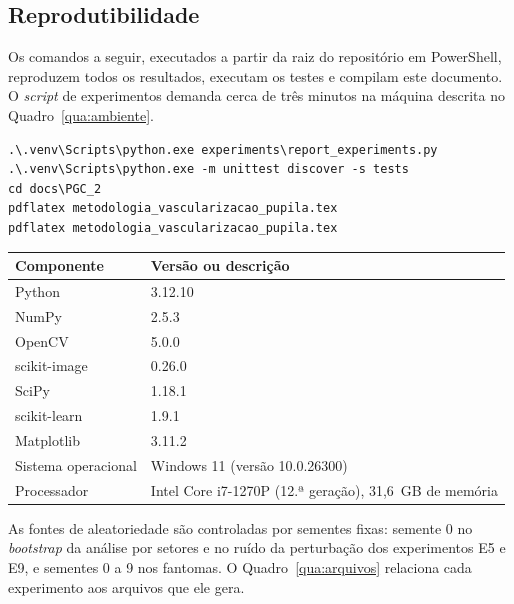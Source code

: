 \documentclass[12pt, oneside, a4paper, chapter=TITLE, section=TITLE,
               english, brazil]{abntex2}
\begin{document}
\begin{apendicesenv}

\chapter{Reprodutibilidade}
\label{ap:repro}

Os comandos a seguir, executados a partir da raiz do repositório em
PowerShell, reproduzem todos os resultados, executam os testes e compilam
este documento. O \emph{script} de experimentos demanda cerca de três minutos
na máquina descrita no Quadro~\ref{qua:ambiente}.

\begin{SingleSpace}
\begin{verbatim}
.\.venv\Scripts\python.exe experiments\report_experiments.py
.\.venv\Scripts\python.exe -m unittest discover -s tests
cd docs\PGC_2
pdflatex metodologia_vascularizacao_pupila.tex
pdflatex metodologia_vascularizacao_pupila.tex
\end{verbatim}
\end{SingleSpace}

\begin{quadro}[htbp]
  \caption{Ambiente de execução dos experimentos}
  \label{qua:ambiente}
  \footnotesize
  \renewcommand{\arraystretch}{1.15}
  \begin{tabular}{|l|l|}
    \hline
    \textbf{Componente} & \textbf{Versão ou descrição} \\ \hline
    Python & 3.12.10 \\ \hline
    NumPy & 2.5.3 \\ \hline
    OpenCV & 5.0.0 \\ \hline
    scikit-image & 0.26.0 \\ \hline
    SciPy & 1.18.1 \\ \hline
    scikit-learn & 1.9.1 \\ \hline
    Matplotlib & 3.11.2 \\ \hline
    Sistema operacional & Windows 11 (versão 10.0.26300) \\ \hline
    Processador & Intel Core i7-1270P (12.ª geração), 31,6~GB de memória \\ \hline
  \end{tabular}
\end{quadro}

As fontes de aleatoriedade são controladas por sementes fixas: semente 0 no
\emph{bootstrap} da análise por setores e no ruído da perturbação dos
experimentos E5 e E9, e sementes 0 a 9 nos fantomas. O
Quadro~\ref{qua:arquivos} relaciona cada experimento aos arquivos que ele
gera.


\end{apendicesenv}
\end{document}
